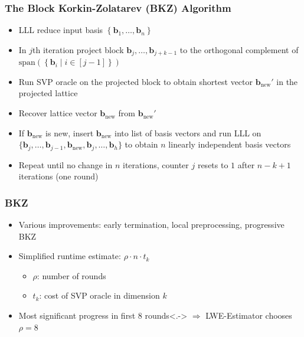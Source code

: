 \documentclass[t, aspectratio=169]{beamer}
\begin{document}
\begin{frame}
    \frametitle{The Block Korkin-Zolatarev (BKZ) Algorithm}
    \begin{itemize}[<+->]
        \item LLL reduce input basis $\left\{\mathbf{b}_1, \dots, \mathbf{b}_{n}\right\}$
        \item In $j$th iteration project block $\mathbf{b}_j, \dots, \mathbf{b}_{j+k-1}$ to the orthogonal complement of $\text{span}\left(\left\{\mathbf{b}_i \mid i \in [j-1]\right\}\right)$ %
        \item Run SVP oracle on the projected block to obtain shortest vector $\mathbf{b}_\text{new}'$ in the projected lattice
        \item Recover lattice vector $\mathbf{b}_\text{new}$ from $\mathbf{b}_\text{new}'$
        \item If $\mathbf{b}_\text{new}$ is new, insert $\mathbf{b}_\text{new}$ into list of basis vectors and run LLL on $\{\mathbf{b}_j, \dots, \mathbf{b}_{j-1}, \mathbf{b}_\text{new}, \mathbf{b}_j, \dots, \mathbf{b}_{h} \}$ to obtain $n$ linearly independent basis vectors
        \item Repeat until no change in $n$ iterations, counter $j$ resets to $1$ after $n-k+1$ iterations (one round)
    \end{itemize}
\end{frame}
\begin{frame}
    \frametitle{BKZ}
    \begin{itemize}[<+->]
        \item Various improvements: early termination, local preprocessing, progressive BKZ
        \item Simplified runtime estimate: $\rho \cdot n \cdot t_k$
              \begin{itemize}
                  \item $\rho$: number of rounds
                  \item $t_k$: cost of SVP oracle in dimension $k$
              \end{itemize}
        \item Most significant progress in first $8$ rounds\only<.->{} $\Rightarrow$ LWE-Estimator chooses $\rho = 8$
    \end{itemize} %
\end{frame}
\end{document}
